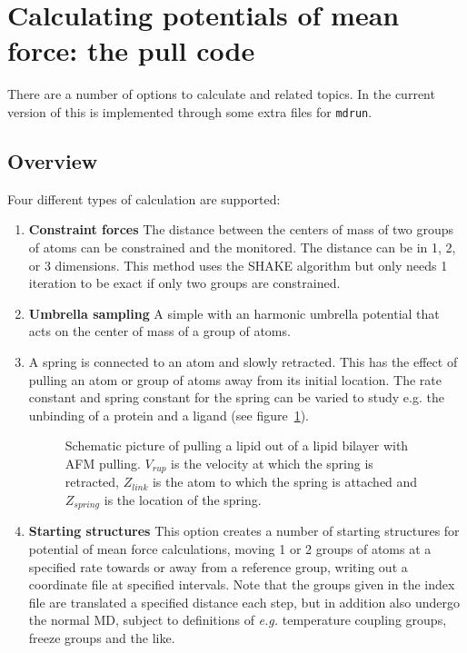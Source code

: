 \section{Calculating potentials of mean force: the pull code}
\label{sec:pull}
There are a number of options to calculate 
and related topics. In the current version of {\gromacs} this is
implemented through some extra files for {\tt mdrun}. 

\subsection{Overview}
Four different types of calculation are supported:

\begin{enumerate}
\item{\textbf{Constraint forces}} The distance between the centers of
mass of two groups of atoms can be constrained and the 
 monitored.
The distance can be in 1, 2, or 3 dimensions. This method
uses the SHAKE algorithm but only needs 1 iteration to be
exact if only two groups are constrained. 
\item{\textbf{Umbrella sampling}} A simple
 with an
harmonic umbrella potential that acts on the center of mass of a group
of atoms.
\item{\textbf{}} A spring is connected to an atom and
slowly retracted. This has the effect of pulling an atom or group of
atoms away from its initial location. The rate constant and spring
constant for the spring can be varied to study e.g. the unbinding of a
protein and a ligand (see figure~\ref{fi:pull}). 
\begin{figure}
\centerline{}
\caption{Schematic picture of pulling a lipid out of a lipid bilayer
with AFM pulling. $V_{rup}$ is the velocity at which the spring is
retracted, $Z_{link}$ is the atom to which the spring is attached and
$Z_{spring}$ is the location of the spring.}
\label{fi:pull} 
\end{figure}   
\item{\textbf{Starting structures}} This option creates a number of
starting structures for potential of mean force calculations, moving 1
or 2 groups of atoms at a specified rate towards or away from a
reference group, writing out a coordinate file at specified intervals.
Note that the groups given in the index file are translated a
specified distance each step, but in addition also undergo the normal
MD, subject to definitions of \emph{e.g.} temperature coupling groups, freeze
groups and the like.
\end{enumerate}

